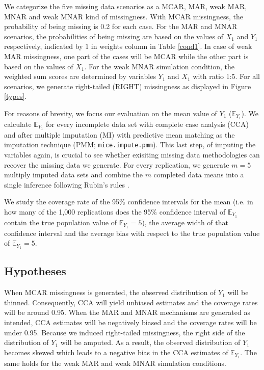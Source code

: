 \documentclass[]{interact}
\newcommand{\code}[1]{\texttt{#1}}
\begin{document}
We categorize the five missing data scenarios as a MCAR, MAR, weak MAR, MNAR and weak MNAR kind of missingness. With MCAR missingness, the probability of being missing is 0.2 for each case. For the MAR and MNAR scenarios, the probabilities of being missing are based on the values of $X_1$ and $Y_1$ respectively, indicated by $1$ in weights column in Table \ref{cond1}. In case of weak MAR missingness, one part of the cases will be MCAR while the other part is based on the values of $X_1$. For the weak MNAR simulation condition, the weighted sum scores are determined by variables $Y_1$ and $X_1$ with ratio 1:5. For all scenarios, we generate right-tailed (RIGHT) missingness as displayed in Figure \ref{types}. 

For reasons of brevity, we focus our evaluation on the mean value of $Y_1$ ($\mathbb{E}_{Y_1}$). We calculate $\mathbb{E}_{Y_1}$ for every incomplete data set with complete case analysis (CCA) and after multiple imputation (MI) with predictive mean matching as the imputation technique (PMM; \code{mice.impute.pmm}). This last step, of imputing the variables again, is crucial to see whether exisiting missing data methodologies can recover the missing data we generate.
For every replication, we generate $m = 5$ multiply imputed data sets and combine the $m$ completed data means into a single inference following Rubin's rules \citep[][pp. 76, 77]{Rubin1987}.

We study the coverage rate of the 95\% confidence intervals for the mean (i.e. in how many of the 1,000 replications does the 95\% confidence interval of $\mathbb{E}_{Y_1}$ contain the true population value of $\mathbb{E}_{Y_1} = 5$), the average width of that confidence interval and the average bias with respect to the true population value of $\mathbb{E}_{Y_1} = 5$. 

\subsection{\normalsize Hypotheses}\label{hypotheses}

When MCAR missingness is generated, the observed distribution of $Y_1$ will be thinned. Consequently, CCA will yield unbiased estimates and the coverage rates will be around 0.95. When the MAR and MNAR mechanisms are generated as intended, CCA estimates will be negatively biased and the coverage rates will be under 0.95. Because we induced right-tailed missingness, the right side of the distribution of $Y_1$ will be amputed. As a result, the observed distribution of $Y_1$ becomes skewed which leads to a negative bias in the CCA estimates of $\mathbb{E}_{Y_1}$. The same holds for the weak MAR and weak MNAR simulation conditions. 
\end{document}
